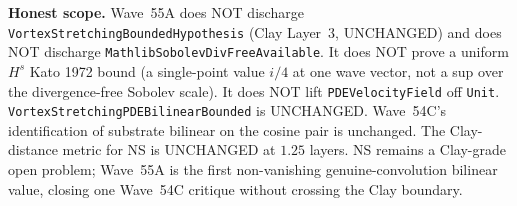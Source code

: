\begin{remark}
\textbf{Honest scope.} Wave~55A does NOT discharge \texttt{VortexStretchingBoundedHypothesis} (Clay Layer~3, UNCHANGED) and does NOT discharge \texttt{MathlibSobolevDivFreeAvailable}. It does NOT prove a uniform $H^s$ Kato 1972 bound (a single-point value $i/4$ at one wave vector, not a sup over the divergence-free Sobolev scale). It does NOT lift \texttt{PDEVelocityField} off \texttt{Unit}. \texttt{VortexStretchingPDEBilinearBounded} is UNCHANGED. Wave~54C's identification of substrate bilinear on the cosine pair is unchanged. The Clay-distance metric for NS is UNCHANGED at $1.25$ layers. NS remains a Clay-grade open problem; Wave~55A is the first non-vanishing genuine-convolution bilinear value, closing one Wave~54C critique without crossing the Clay boundary.
\end{remark}

